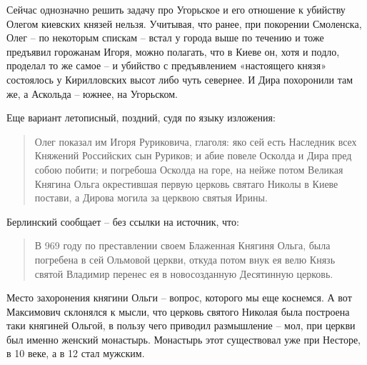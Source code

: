 


Сейчас однозначно решить задачу про Угорьское и его отношение к убийству Олегом киевских князей нельзя. Учитывая, что ранее, при покорении Смоленска, Олег – по некоторым спискам – встал у города выше по течению и тоже предъявил горожанам Игоря, можно полагать, что в Киеве он, хотя и подло, проделал то же самое – и убийство с предъявлением «настоящего князя» состоялось у Кирилловских высот либо чуть севернее. И Дира похоронили там же, а Аскольда – южнее, на Угорьском.

Еще вариант летописный, поздний, судя по языку изложения:

\begin{quotation}
Олег показал им Игоря Руриковича, глаголя: яко сей есть Наследник всех Княжений Российских сын Руриков; и абие повеле Осколда и Дира пред собою побити; и погребоша Осколда на горе, на нейже потом Великая Княгина Ольга окрестившая первую церковь святаго Николы в Киеве постави, а Дирова могила за церквою святыя Ирины.
\end{quotation}

Берлинский сообщает – без ссылки на источник, что:

\begin{quotation}
В 969 году по преставлении своем Блаженная Княгиня Ольга, была погребена в сей Ольмовой церкви, откуда потом внук ея велю Князь святой Владимир перенес ея в новосозданную Десятинную церковь.
\end{quotation}

Место захоронения княгини Ольги – вопрос, которого мы еще коснемся. А вот Максимович склонялся к мысли, что церковь святого Николая была построена таки княгиней Ольгой, в пользу чего приводил размышление – мол, при церкви был именно женский монастырь. Монастырь этот существовал уже при Несторе, в 10 веке, а в 12 стал мужским.

